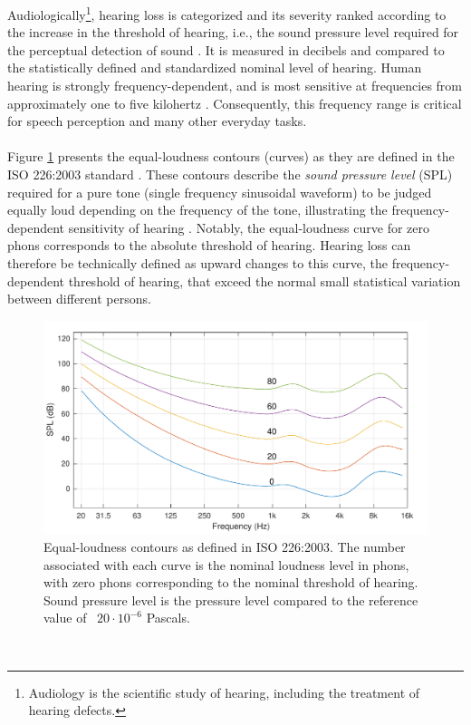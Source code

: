 \documentclass[english, 12pt, a4paper, pdftex, elec, utf8]{aaltothesis}
\begin{document}
Audiologically\footnote{Audiology is the scientific study of hearing, including the treatment of hearing defects.}, hearing loss is categorized and its severity ranked according to the increase in the threshold of hearing, i.e., the sound pressure level required for the perceptual detection of sound \cite{moore2007cochlear}. It is measured in decibels and compared to the statistically defined and standardized nominal level of hearing. Human hearing is strongly frequency-dependent, and is most sensitive at frequencies from approximately one to five kilohertz \cite{pulkki2015communication}. Consequently, this frequency range is critical for speech perception and many other everyday tasks. \\\\ Figure \ref{fig:loudness} presents the equal-loudness contours (curves) as they are defined in the ISO 226:2003 standard \cite{iso226}. These contours describe the \textit{sound pressure level} (SPL) required for a pure tone (single frequency sinusoidal waveform) to be judged equally loud depending on the frequency of the tone, illustrating the frequency-dependent sensitivity of hearing \cite{pulkki2015communication}. Notably, the equal-loudness curve for zero phons corresponds to the absolute threshold of hearing. Hearing loss can therefore be technically defined as upward changes to this curve, the frequency-dependent threshold of hearing, that exceed the normal small statistical variation between different persons. \\
\begin{figure}[]
	\centering 
	\includegraphics[width=\textwidth]{loudness.pdf}
	\caption{Equal-loudness contours as defined in ISO 226:2003. The number associated with each curve is the nominal loudness level in phons, with zero phons corresponding to the nominal threshold of hearing. Sound pressure level is the pressure level compared to the reference value of \ $ \mathit{20 \cdot 10^{-6}}$ Pascals. \cite{iso226}}
	\label{fig:loudness} 
\end{figure} \\
\end{document}
